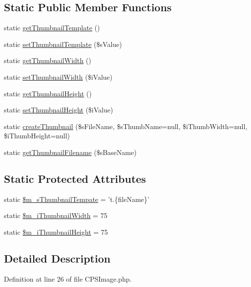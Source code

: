 \subsection*{Static Public Member Functions}
\begin{DoxyCompactItemize}
\item 
static \hyperlink{classCPSImage_ac7862e00efddf9b8ac715d0f41eeee3b}{getThumbnailTemplate} ()
\item 
static \hyperlink{classCPSImage_a565140bdb6d832a04c40f350b15bb5ec}{setThumbnailTemplate} (\$sValue)
\item 
static \hyperlink{classCPSImage_abf99af71ba8472720b08aff7c2d76906}{getThumbnailWidth} ()
\item 
static \hyperlink{classCPSImage_a4de06d501714d80cd5c3f4f7c56133df}{setThumbnailWidth} (\$iValue)
\item 
static \hyperlink{classCPSImage_afd146566ba0b7fbb287ff4bfe23758bb}{getThumbnailHeight} ()
\item 
static \hyperlink{classCPSImage_a9ef58f1f510c322962b29e5b94ddab4f}{setThumbnailHeight} (\$iValue)
\item 
static \hyperlink{classCPSImage_a8a9c3ed39d449a2c9954a74d91fb7477}{createThumbnail} (\$sFileName, \$sThumbName=null, \$iThumbWidth=null, \$iThumbHeight=null)
\item 
static \hyperlink{classCPSImage_ab131d595423651025d820f83ba1f056c}{getThumbnailFilename} (\$sBaseName)
\end{DoxyCompactItemize}
\subsection*{Static Protected Attributes}
\begin{DoxyCompactItemize}
\item 
static \hyperlink{classCPSImage_a28221a0c54da49994a1f96ec06ef4280}{\$m\_\-sThumbnailTempate} = 't.\{fileName\}'
\item 
static \hyperlink{classCPSImage_a2f67e1aa9031010559601184c28397e0}{\$m\_\-iThumbnailWidth} = 75
\item 
static \hyperlink{classCPSImage_a31914fa7bb06596b268b9dbf4aabe9b1}{\$m\_\-iThumbnailHeight} = 75
\end{DoxyCompactItemize}


\subsection{Detailed Description}


Definition at line 26 of file CPSImage.php.



